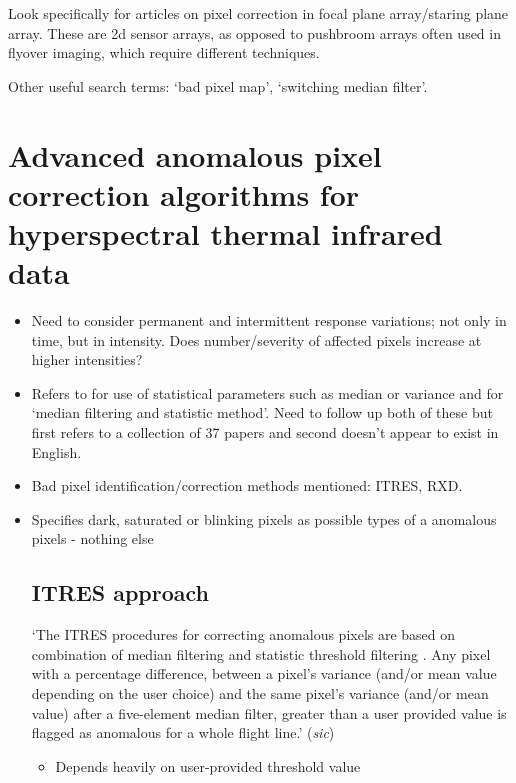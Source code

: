 \documentclass[10pt,fleqn]{article}
\begin{document}
Look specifically for articles on pixel correction in focal plane array/staring plane array. These are 2d sensor arrays, as opposed to pushbroom arrays often used in flyover imaging, which require different techniques.

Other useful search terms: `bad pixel map', `switching median filter'.

\section{Advanced anomalous pixel correction algorithms for hyperspectral thermal infrared data \cite{Santini2014}}

\begin{itemize}

\item
Need to consider permanent and intermittent response variations; not only in time, but in intensity. Does number/severity of affected pixels increase at higher intensities?

\item
Refers to \cite{Cracknell2013} for use of statistical parameters such as median or variance and \cite{Liu2009} for `median filtering and statistic method'. Need to follow up both of these but first refers to a collection of 37 papers and second doesn't appear to exist in English.

\item
Bad pixel identification/correction methods mentioned: ITRES, RXD.

\item
Specifies dark, saturated or blinking pixels as possible types of a anomalous pixels - nothing else

\subsection{ITRES approach}
`The ITRES procedures for correcting anomalous pixels are based on combination of median filtering and statistic threshold filtering \cite{Cracknell2013}. Any pixel with a percentage difference, between a pixel's variance (and/or mean value depending on the user choice) and the same pixel's variance (and/or mean value) after a five-element median filter, greater than a user provided value is flagged as anomalous for a whole flight line.' (\textit{sic})

\begin{itemize}
\item
Depends heavily on user-provided threshold value
\end{itemize}


\end{itemize}
\end{document}
